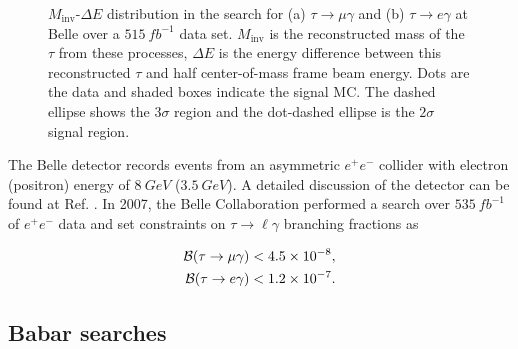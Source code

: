 \documentclass[12pt]{thesis}  %
\newcommand{\br}{\mathcal{B}}
\newcommand{\tmg}{\tau\to\mu\gamma}
\newcommand{\tlg}{\tau\to\ell\gamma}
\begin{document}
\begin{figure}[h]
\begin{subfigure}[b]{0.475\textwidth}
            \caption[]%
            {{\small}}    
            \label{fig:mean and std of net24}
        \end{subfigure}
        \caption{$M_{\text{inv}}$-$\Delta E$ distribution in the search for (a) $\tau\to\mu\gamma$ and (b) $\tau\to e\gamma$ at Belle over a $\SI{515}{fb^{-1}}$ data set. $M_{\text{inv}}$ is the reconstructed mass of the $\tau$ from these processes, $\Delta E$ is the energy difference between this reconstructed $\tau$ and half center-of-mass frame beam energy. Dots are the data and shaded boxes indicate the signal MC. The dashed ellipse shows the $3\sigma$ region and the dot-dashed ellipse is the $2\sigma$ signal region.}
    \end{figure}


The Belle detector records events from an asymmetric $e^+ e^-$ collider with electron (positron) energy of $\SI{8}{GeV}$ ($\SI{3.5}{GeV}$). A detailed discussion of the detector can be found at Ref. \cite{Belle:2002}. In 2007, the Belle Collaboration performed a search over $\SI{535}{fb^{-1}}$ of $e^+ e^-$ data and set constraints \cite{Hayasaka:2007} on $\tlg$ branching fractions as

\begin{align*}
\br(\tmg)&<\num{4.5d-8},\\
\br(\tau\to e \gamma)&<\num{1.2d-7}.
\end{align*}



\subsection{Babar searches}
\end{document}
